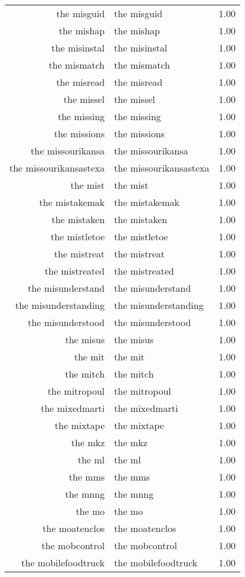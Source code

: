 \begin{table}[ht]
\begin{tabular}{rlr}
  the misguid & the misguid & 1.00 \\ 
  the mishap & the mishap & 1.00 \\ 
  the misinstal & the misinstal & 1.00 \\ 
  the mismatch & the mismatch & 1.00 \\ 
  the misread & the misread & 1.00 \\ 
  the missel & the missel & 1.00 \\ 
  the missing & the missing & 1.00 \\ 
  the missions & the missions & 1.00 \\ 
  the missourikansa & the missourikansa & 1.00 \\ 
  the missourikansastexa & the missourikansastexa & 1.00 \\ 
  the mist & the mist & 1.00 \\ 
  the mistakemak & the mistakemak & 1.00 \\ 
  the mistaken & the mistaken & 1.00 \\ 
  the mistletoe & the mistletoe & 1.00 \\ 
  the mistreat & the mistreat & 1.00 \\ 
  the mistreated & the mistreated & 1.00 \\ 
  the misunderstand & the misunderstand & 1.00 \\ 
  the misunderstanding & the misunderstanding & 1.00 \\ 
  the misunderstood & the misunderstood & 1.00 \\ 
  the misus & the misus & 1.00 \\ 
  the mit & the mit & 1.00 \\ 
  the mitch & the mitch & 1.00 \\ 
  the mitropoul & the mitropoul & 1.00 \\ 
  the mixedmarti & the mixedmarti & 1.00 \\ 
  the mixtape & the mixtape & 1.00 \\ 
  the mkz & the mkz & 1.00 \\ 
  the ml & the ml & 1.00 \\ 
  the mms & the mms & 1.00 \\ 
  the mnng & the mnng & 1.00 \\ 
  the mo & the mo & 1.00 \\ 
  the moatenclos & the moatenclos & 1.00 \\ 
  the mobcontrol & the mobcontrol & 1.00 \\ 
  the mobilefoodtruck & the mobilefoodtruck & 1.00 \\ 

\end{tabular}
\end{table}
